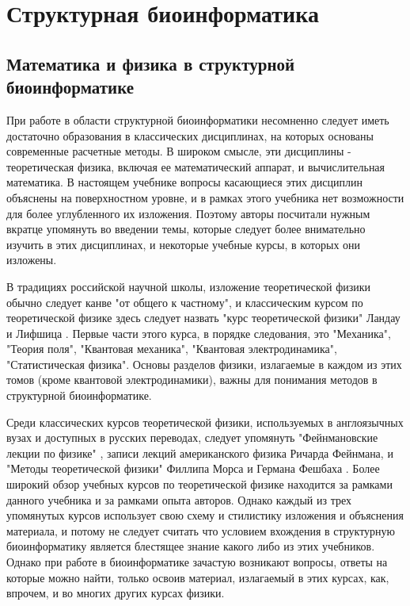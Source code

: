 

\chapter{Структурная биоинформатика} \label{phys_sbio}

\section{Математика и физика в структурной биоинформатике} \label{sect1_1}

При работе в области структурной биоинформатики несомненно следует иметь достаточно образования в классических дисциплинах, на которых основаны современные расчетные методы. В широком смысле, эти дисциплины - теоретическая физика, включая ее математический аппарат, и вычислительная математика. В настоящем учебнике вопросы касающиеся этих дисциплин объяснены на поверхностном уровне, и в рамках этого учебника нет возможности для более углубленного их изложения. Поэтому авторы посчитали нужным вкратце упомянуть во введении темы, которые следует более внимательно изучить в этих дисциплинах, и некоторые учебные курсы, в которых они изложены.

В традициях российской научной школы, изложение теоретической физики обычно следует канве "от общего к частному", и классическим курсом по теоретической физике здесь следует назвать "курс теоретической физики" Ландау и Лифшица \parencite{Ландау_1,Ландау_2,Ландау_3,Ландау_5}. Первые части этого курса, в порядке следования, это "Механика", "Теория поля", "Квантовая механика", "Квантовая электродинамика", "Статистическая физика". Основы разделов физики, излагаемые в каждом из этих томов (кроме квантовой электродинамики), важны для понимания методов в структурной биоинформатике. 


Среди классических курсов теоретической физики, используемых в англоязычных вузах и доступных в русских переводах, следует упомянуть "Фейнмановские лекции по физике" \parencite{Фейнман_eng,Фейнман_rus}, записи лекций американского физика Ричарда Фейнмана, и "Методы теоретической физики" Филлипа Морса и Германа Фешбаха \parencite{Morse_eng,Морс_1,Морс_2}. Более широкий обзор учебных курсов по теоретической физике находится за рамками данного учебника и за рамками опыта авторов. Однако каждый из трех упомянутых курсов использует свою схему и стилистику изложения и объяснения материала, и потому не следует считать что условием вхождения в структурную биоинформатику является блестящее знание какого либо из этих учебников. Однако при работе в биоинформатике зачастую возникают вопросы, ответы на которые можно найти, только освоив материал, излагаемый в этих курсах, как, впрочем, и во многих других курсах физики.

